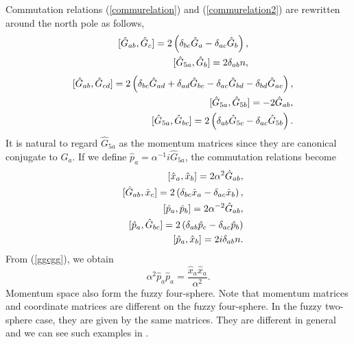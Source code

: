 \documentclass[a4paper,11pt]{article}
\begin{document}
Commutation relations 
(\ref{commurelation}) and (\ref{commurelation2}) 
are rewritten around the north pole 
as follows, 
\begin{eqnarray}
&&[\hat{G}_{ab},\hat{G}_{c}]=2\left(
\delta_{bc}\hat{G}_{a}-\delta_{ac}\hat{G}_{b}
\right), \cr
&&[\hat{G}_{5a},\hat{G}_{b}]=2\delta_{ab}n , 
\label{wignerrelation1}
\end{eqnarray}
\begin{eqnarray}
&&[\hat{G}_{ab},\hat{G}_{cd}]=2\left(
\delta_{bc}\hat{G}_{ad}+\delta_{ad}\hat{G}_{bc}
-\delta_{ac}\hat{G}_{bd}-\delta_{bd}\hat{G}_{ac}
\right), \cr
&&[\hat{G}_{5a},\hat{G}_{5b}]=-2\hat{G}_{ab}, \cr
&&[\hat{G}_{5a},\hat{G}_{bc}]=2\left(
\delta_{ab}\hat{G}_{5c}-\delta_{ac}\hat{G}_{5b}\right).  
\label{wignerrelation2}
\end{eqnarray} 
It is natural to regard $\hat{G}_{5a}$ as 
the momentum matrices since they are canonical conjugate 
to $\hat{G}_{a}$. 
If we define 
$\hat{p}_{a}=\alpha^{-1}i \hat{G}_{5a}$, 
the commutation relations become 
\begin{eqnarray}
&&[\hat{x}_{a},\hat{x}_{b}]=2\alpha^{2}\hat{G}_{ab}, \cr
&&[\hat{G}_{ab},\hat{x}_{c}]=2\left(
\delta_{bc}\hat{x}_{a}-\delta_{ac}\hat{x}_{b}
\right), \cr
&&[\hat{p}_{a},\hat{p}_{b}]=2\alpha^{-2}\hat{G}_{ab}, \cr
&&[\hat{p}_{a},\hat{G}_{bc}]=2\left(
\delta_{ab}\hat{p}_{c}-\delta_{ac}\hat{p}_{b}\right) \cr 
&&[\hat{p}_{a},\hat{x}_{b}]=2i\delta_{ab}n. 
\end{eqnarray}
From (\ref{ggcgg}), we obtain 
\begin{equation}
\alpha^{2}\hat{p}_{a}\hat{p}_{a}
=\frac{\hat{x}_{a}\hat{x}_{a}}{\alpha^{2}}. 
\end{equation} 
Momentum space also form the fuzzy four-sphere. 
Note that 
momentum matrices and coordinate matrices are different 
on the fuzzy four-sphere. 
In the fuzzy two-sphere case, they are given by the same matrices. 
They are different in general and we can see such examples 
in \cite{HoYeh,CorSch,PMHo}. 
\end{document}
